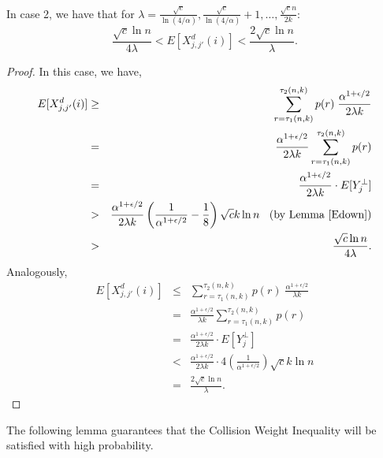 \documentclass[11pt]{article}
\begin{document}
\begin{lemma}\label{case2}
In case 2, we have that for $\lambda = \frac{\sqrt{c}}{\ln({4}/{\alpha})}, 
    \frac{\sqrt{c}}{\ln({4}/{\alpha})}+1 ,\ldots, 
    \frac{\sqrt{c} n}{2 k}$:
    \[
    \frac{\sqrt{c} \ln n }{4\lambda}
    < E[X^d_{j,j'}(i)] <
     \frac{2 \sqrt{c} \ln n }{\lambda }.
    \]
\end{lemma}
\begin{proof}
In this case, we have,
\begin{eqnarray*}
E[X^d_{j,j'}(i)] 
          & \ge & \sum_{r= \tau_1(n,k) }^{\tau_2(n,k)} p(r)\; \frac{\alpha^{1+\epsilon/2} }{2\lambda k} \\
          & = & \frac{\alpha^{1+\epsilon/2} }{2\lambda k} \sum_{r= \tau_1(n,k) }^{\tau_2(n,k)} p(r)  \\
          & = & \frac{\alpha^{1+\epsilon/2} }{2\lambda k}\cdot E[Y^{\perp}_j]   \\           
          & > & \frac{\alpha^{1+\epsilon/2} }{2\lambda k} \left (\frac{1}{\alpha^{1 + \epsilon/2}} - \frac{1}{8} \right )\sqrt{c} k \ln n 
          \;\; \text{ (by Lemma \ref{Edown})}\\
          & > & \frac{\sqrt{c} \ln n }{4\lambda }.
\end{eqnarray*}
Analogously,
\begin{eqnarray*}
   E[X^d_{j,j'}(i)] 
          & \le & \sum_{r= \tau_1(n,k) }^{\tau_2(n,k)} p(r)\; \frac{\alpha^{1+\epsilon/2} }{\lambda k} \\
          & = & \frac{\alpha^{1+\epsilon/2} }{\lambda k} \sum_{r= \tau_1(n,k) }^{\tau_2(n,k)} p(r)  \\
          & = & \frac{\alpha^{1+\epsilon/2} }{2\lambda k}\cdot E[Y^{\perp}_j]  \\
          & < & \frac{\alpha^{1+\epsilon/2} }{2\lambda k}\cdot 4\left (\frac{1}{\alpha^{1 + \epsilon/2}}  \right )\sqrt{c} k \ln n\\
          & = & \frac{2 \sqrt{c} \ln n }{\lambda }.
\end{eqnarray*}  
\end{proof}


The following lemma guarantees that the Collision Weight Inequality will be satisfied with high probability.
\end{document}
